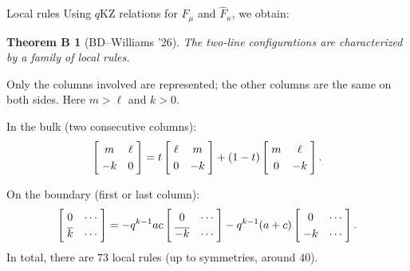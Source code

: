 \documentclass[10pt]{beamer}
\makeatletter
\newcommand{\important}[1]{\textcolor{uibred}{#1}}
\newcommand{\hb}[1]{\overline{#1}}
\newcommand{\conf}[2][2]{%
  \begingroup
  \renewcommand{\arraystretch}{1.25}%
  \left[
  \begin{array}{@{\;}c*{\numexpr#1-1\relax}{@{\quad}c}@{\;}}
  #2
  \end{array}
  \right]%
  \endgroup
}
\newtheorem*{thmB}{Theorem B}
\makeatother
\begin{document}
\begin{frame}{Local rules}
Using $q$KZ relations for $F_\mu$ and $\widehat F_\kappa$, we obtain:
\begin{thmB}[BD--Williams '26]
The two-line configurations are characterized by a family of \important{local rules}.
\end{thmB}
Only the columns involved are represented; the other columns are the same on both sides. Here $m>\ell$ and $k>0$.

\medskip
In the bulk (two consecutive columns):
\[
\conf{m & \ell\\ -k & 0}
=t\conf{\ell & m\\ 0 & -k}+(1-t)\conf{m & \ell\\ 0 & -k}.
\]

\medskip
On the boundary (first or last column):
\[
\conf{0 & \cdots\\ \hb{k} & \cdots}
=-q^{k-1}ac\conf{0 & \cdots\\ \hb{-k} & \cdots}-q^{k-1}(a+c)\conf{0 & \cdots\\ -k & \cdots}.
\]
In total, there are $73$ local rules (up to symmetries, around $40$).
\end{frame}
\end{document}
